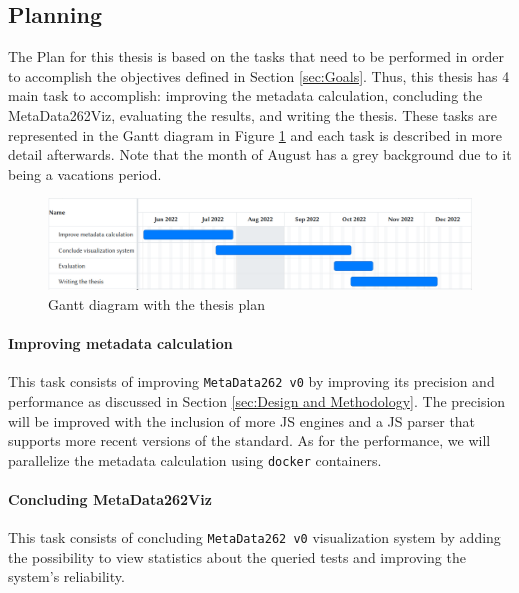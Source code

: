 \documentclass[runningheads]{llncs}
\begin{document}
\subsection{Planning}
\label{sub:planning}


The Plan for this thesis is based on the tasks that need to be performed in order to accomplish the objectives defined in Section \ref{sec:Goals}. Thus, this thesis has 4 main task to accomplish: improving the metadata calculation, concluding the MetaData262Viz, evaluating the results, and writing the thesis. These tasks are represented in the Gantt diagram in Figure \ref{fig:gantt} and each task is described in more detail afterwards. Note that the month of August has a grey background due to it being a vacations period.


\begin{figure}[ht]
    \centering
    \includegraphics[width=1\textwidth]{images/gantt_thesis_month.png}
    \caption{Gantt diagram with the thesis plan}
    \label{fig:gantt}
\end{figure}



\paragraph{Improving metadata calculation}
This task consists of improving \texttt{MetaData262 v0} by improving its precision and performance as discussed in Section \ref{sec:Design and Methodology}. The precision will be improved with the inclusion of more JS engines and a JS parser that supports more recent versions of the standard. As for the performance, we will parallelize the metadata calculation using \texttt{docker} containers.


\paragraph{Concluding MetaData262Viz}
This task consists of concluding \texttt{MetaData262 v0} visualization system by adding the possibility to view statistics about the queried tests and improving the system's reliability.
\end{document}

